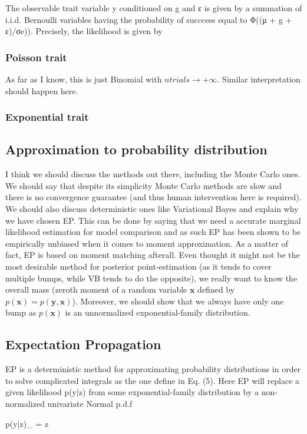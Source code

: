 The observable trait variable y conditioned on g and ε is given by a summation of i.i.d.
Bernoulli variables having the probability of succcess equal to Φ((μ + g + ε)/σe)). Precisely,
the likelihood is given by

\subsubsection{Poisson trait}

As far as I know, this is just Binomial with $ntrials \rightarrow +\infty$. Similar interpretation should happen here.

\subsubsection{Exponential trait}



\subsection{Approximation to probability distribution}

I think we should discuss the methods out there, including the Monte Carlo ones. We should say that despite its simplicity Monte Carlo methods are slow and there is no convergence guarantee (and thus human intervention here is required). We should also discuss deterministic ones like Variational Bayes and explain why we have chosen EP. This can be done by saying that we need a accurate marginal likelihood estimation for model comparison and as such EP has been shown to be empirically unbiased when it comes to moment approximation. As a matter of fact, EP is based on moment matching afterall. Even thought it might not be the most desirable method for posterior point-estimation (as it tends to cover multiple bumps, while VB tends to do the opposite), we really want to know the overall mass (zeroth moment of a random variable $\mathbf x$ defined by $p(\mathbf x) = p(\mathbf y, \mathbf x)$). Moreover, we should show that we always have only one bump as $p(\mathbf x)$ is an unnormalized exponential-family distribution.

\subsection{Expectation Propagation}

EP is a deterministic method for approximating probability distributions in order to solve complicated integrals as the one define in Eq. (5). Here EP will replace a given likelihood p(y|z) from some exponential-family distribution by a non-normalized univariate Normal p.d.f
\begin{*align}
p(y|z)_{\EP} = \tilde z 
\end{*align}

